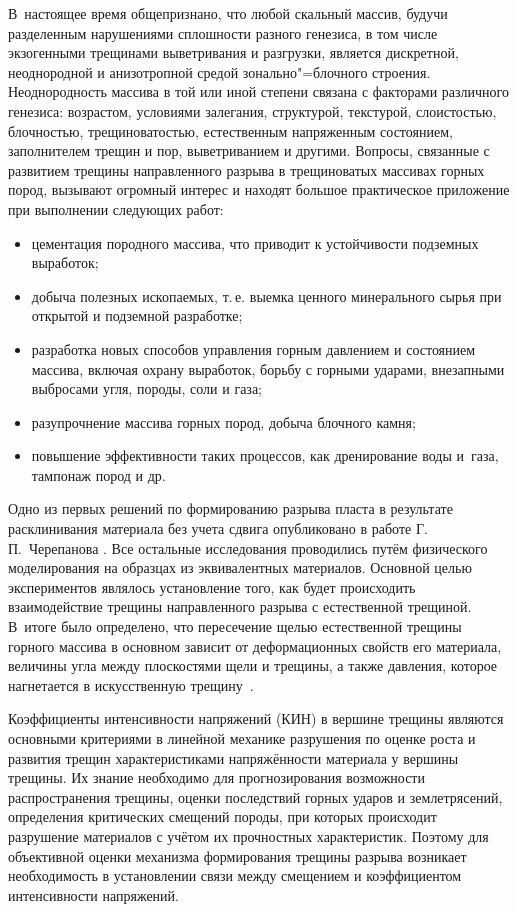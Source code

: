 В~настоящее время общепризнано, что любой скальный массив, будучи разделенным нарушениями сплошности разного генезиса, в том числе экзогенными трещинами выветривания и разгрузки, является дискретной, неоднородной и анизотропной средой зонально"=блочного строения. Неоднородность массива в той или иной степени связана с факторами различного генезиса: возрастом, условиями залегания, структурой, текстурой, слоистостью, блочностью, трещиноватостью, естественным напряженным состоянием, заполнителем трещин и пор, выветриванием и другими.
Вопросы, связанные с развитием трещины направленного разрыва в трещиноватых массивах горных пород, вызывают огромный интерес и находят большое практическое приложение при выполнении следующих работ:
\begin{itemize}
\item[--] цементация породного массива, что приводит к устойчивости подземных выработок;

\item[--] добыча полезных ископаемых, т.\,е. выемка ценного минерального сырья при открытой и подземной разработке;

\item[--] разработка новых способов управления горным давлением и состоянием массива, включая охрану выработок, борьбу с горными ударами, внезапными выбросами угля, породы, соли и газа;

\item[--] разупрочнение массива горных пород, добыча блочного камня;

\item[--] повышение эффективности таких процессов, как дренирование воды и~газа, тампонаж пород и др.
\end{itemize}

Одно из первых решений по формированию разрыва пласта в результате расклинивания материала без учета сдвига опубликовано в работе Г.\,П.~Черепанова \cite{SpirBel:bib:Cherepanov}.
Все остальные исследования проводились путём физического моделирования на образцах из эквивалентных материалов. 
Основной целью экспериментов являлось установление того, как будет происходить взаимодействие трещины направленного разрыва с естественной трещиной. 
В~итоге было определено, что пересечение щелью естественной трещины горного массива в основном зависит от деформационных свойств его  материала, величины угла между плоскостями щели и трещины, а также давления, которое нагнетается в искусственную трещину~\cite{SpirBel:bib:Hjamjaljaynen}.

Коэффициенты интенсивности напряжений (КИН) в вершине трещины являются основными критериями в линейной механике разрушения по оценке роста и развития трещин характеристиками напряжённости материала у вершины трещины. 
Их знание необходимо для прогнозирования возможности распространения трещины, оценки последствий горных ударов и землетрясений, определения критических смещений породы, при которых происходит разрушение материалов с учётом их прочностных характеристик. 
Поэтому для объективной оценки механизма формирования трещины разрыва возникает необходимость в установлении связи между смещением и коэффициентом интенсивности напряжений.

